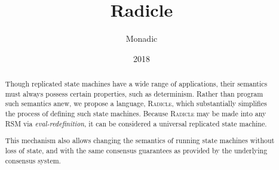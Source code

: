\documentclass[a4paper, 9pt, draft]{amsart}
\title[Radicle]{Radicle}
\author{Monadic}
\date{2018}
\newcommand{\rad}{\textsc{Radicle}}
\begin{document}
\begin{abstract}
    Though replicated state machines have a wide range of applications, their
    semantics must always possess certain properties, such as determinism.
    Rather than program such semantics anew, we propose a language, \rad{},
    which substantially simplifies the process of defining such state machines.
    Because \rad{} may be made into any RSM via \emph{eval-redefinition}, it
    can be considered a universal replicated state machine.

    This mechanism also allows changing the semantics of running state machines
    without loss of state, and with the same consensus guarantees as provided
    by the underlying consensus system.
\end{abstract}
\maketitle

\setlength{\columnsep}{20pt}
\begin{multicols}{2}







\end{multicols}


\appendix
%



\end{document}
